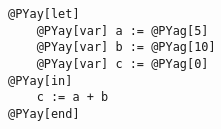 \begin{Verbatim}[commandchars=@\[\]]
@PYay[let]
    @PYay[var] a := @PYag[5]
    @PYay[var] b := @PYag[10]
    @PYay[var] c := @PYag[0]
@PYay[in]
    c := a + b
@PYay[end]
\end{Verbatim}
